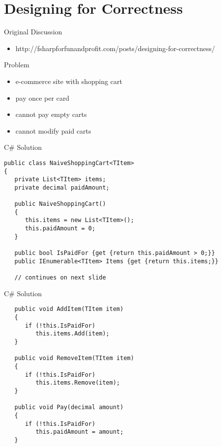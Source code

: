\documentclass{beamer}
\begin{document}
\section{Designing for Correctness}
\frame{\tableofcontents[currentsection]}

\begin{frame}{Original Discussion}
  \begin{itemize}
    \item http://fsharpforfunandprofit.com/posts/designing-for-correctness/
  \end{itemize}
\end{frame}

\begin{frame}{Problem}
  \begin{itemize}[<+->]
    \item e-commerce site with shopping cart
    \item pay once per card
    \item cannot pay empty carts
    \item cannot modify paid carts
  \end{itemize}
\end{frame}

\begin{frame}[fragile]{C\# Solution}
  \small
  \begin{verbatim}
public class NaiveShoppingCart<TItem>
{
   private List<TItem> items;
   private decimal paidAmount;

   public NaiveShoppingCart()
   {
      this.items = new List<TItem>();
      this.paidAmount = 0;
   }

   public bool IsPaidFor {get {return this.paidAmount > 0;}}
   public IEnumerable<TItem> Items {get {return this.items;}}

   // continues on next slide
  \end{verbatim}
\end{frame}


\begin{frame}[label=pat1,fragile]{C\# Solution}
  \small
  \begin{verbatim}
   public void AddItem(TItem item)
   {
      if (!this.IsPaidFor)
         this.items.Add(item);
   }

   public void RemoveItem(TItem item)
   {
      if (!this.IsPaidFor)
         this.items.Remove(item);
   }

   public void Pay(decimal amount)
   {
      if (!this.IsPaidFor)
         this.paidAmount = amount;
   }
  \end{verbatim}
\end{frame}
\end{document}

